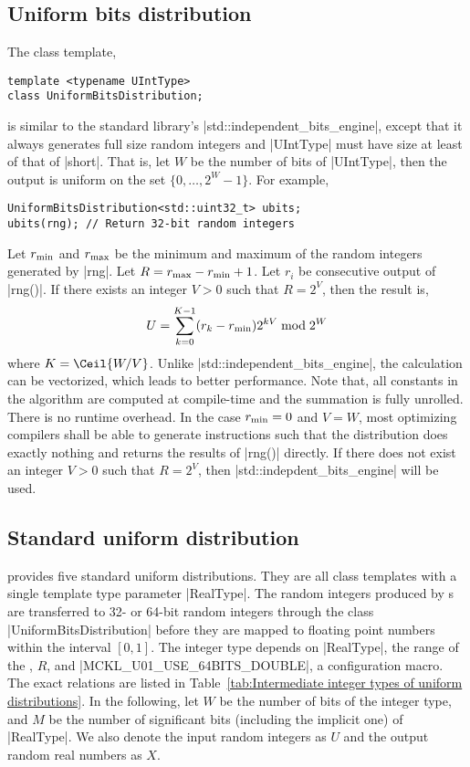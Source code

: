 \subsection{Uniform bits distribution}
\label{sub:Uniform bits distribution}

The class template,
\begin{Verbatim}
template <typename UIntType>
class UniformBitsDistribution;
\end{Verbatim}
is similar to the standard library's |std::independent_bits_engine|, except
that it always generates full size random integers and |UIntType| must have
size at least of that of |short|. That is, let $W$ be the number of bits of
|UIntType|, then the output is uniform on the set $\{0,\dots,2^W - 1\}$. For
example,
\begin{Verbatim}
UniformBitsDistribution<std::uint32_t> ubits;
ubits(rng); // Return 32-bit random integers
\end{Verbatim}
Let $r_{\mathrm{min}}$ and $r_{\mathrm{max}}$ be the minimum and maximum of the random integers
generated by |rng|. Let $R = r_{\mathrm{max}} - r_{\mathrm{min}} + 1$. Let $r_i$ be consecutive
output of |rng()|. If there exists an integer $V > 0$ such that $R = 2^V$, then
the result is,
\begin{equation*}
  U = \sum_{k = 0}^{K - 1} (r_k - r_{\mathrm{min}}) 2^{kV} \bmod 2^W
\end{equation*}
where $K = \Ceil{W / V}$. Unlike |std::independent_bits_engine|, the
calculation can be vectorized, which leads to better performance. Note that,
all constants in the algorithm are computed at compile-time and the summation
is fully unrolled. There is no runtime overhead. In the case $r_{\mathrm{min}} = 0$ and $V
= W$, most optimizing compilers shall be able to generate instructions such
that the distribution does exactly nothing and returns the results of |rng()|
directly. If there does not exist an integer $V > 0$ such that $R = 2^V$, then
|std::indepdent_bits_engine| will be used.

\subsection{Standard uniform distribution}
\label{sub:Standard uniform distribution}

\mckl provides five standard uniform distributions. They are all class
templates with a single template type parameter |RealType|. The random integers
produced by \rng{}s are transferred to 32- or 64-bit random integers through
the class |UniformBitsDistribution| before they are mapped to floating point
numbers within the interval $[0, 1]$. The integer type depends on |RealType|,
the range of the \rng{}, $R$, and |MCKL_U01_USE_64BITS_DOUBLE|, a configuration
macro. The exact relations are listed in Table~\ref{tab:Intermediate integer
types of uniform distributions}. In the following, let $W$ be the number of
bits of the integer type, and $M$ be the number of significant bits (including
the implicit one) of |RealType|. We also denote the input random integers as
$U$ and the output random real numbers as $X$.

